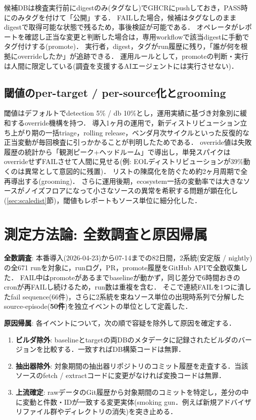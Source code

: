 \documentclass{css}
\begin{document}
候補DBは検査実行前にdigestのみ(タグなし)でGHCRにpushしておき，PASS時にのみタグを付けて「公開」する．
FAILした場合，候補はタグなしのままdigestで取得可能な状態で残るため，事後検証が可能である．
オペレータがレポートを確認し正当な変更と判断した場合は，専用workflowで該当digestに手動でタグ付けする(promote)．
実行者，digest，タグがrun履歴に残り，「誰が何を根拠にoverrideしたか」が追跡できる．
運用ルールとして，promoteの判断・実行は人間に限定している(調査を支援するAIエージェントには実行させない)．

\subsection{閾値のper-target / per-source化とgrooming}
\label{sec:threshold}

閾値はデフォルトでdetection 5\% / db 10\%とし，運用実績に基づき対象別に緩和するoverride機構を持つ．
導入1ヶ月の運用で，新ディストリビューション立ち上がり期の一括triage，rolling release，ベンダ月次サイクルといった反復的な正当変動が毎回検査に引っかかることが判明したためである．
override値は失敗履歴の統計から「観測ピーク+ヘッドルーム」で導出し，単発スパイクはoverrideせずFAILさせて人間に見せる(例: EOLディストリビューションが39\%動くのは異常として意図的に残置)．
リストの陳腐化を防ぐため約2ヶ月周期で全再導出する(grooming)．
さらに運用後期，ecosystem一括の変動率では大きなソースがノイズフロアになって小さなソースの異常を希釈する問題が顕在化し(\ref{sec:scaledist}節)，閾値もレポートもソース単位に細分化した．

\section{測定方法論: 全数調査と原因帰属}
\label{sec:method}

\textbf{全数調査}:
本番導入(2026-04-23)から07-14までの82日間，2系統(安定版 / nightly)の全671 runを対象に，runログ，PR，promote履歴をGitHub APIで全数収集した．
FAIL中はpromoteがあるまでbaselineが動かず，同じ差分で6時間おきのcronが再FAILし続けるため，run数は重複を含む．
そこで連続FAILを1つに潰したfail sequence(66件)，さらに2系統を束ねソース単位の出現時系列で分解したsource-episode(\textbf{50件})を独立イベントの単位として定義した．

\textbf{原因帰属}:
各イベントについて，次の順で容疑を除外して原因を確定する．

\begin{enumerate}
\item \textbf{ビルダ除外}: baselineとtargetの両DBのメタデータに記録されたビルダのバージョンを比較する．一致すればDB構築コードは無罪．
\item \textbf{抽出器除外}: 対象期間の抽出器リポジトリのコミット履歴を走査する．当該ソースのfetch / extractコードに変更がなければ変換コードは無罪．
\item \textbf{上流確定}: rawデータのGit履歴から対象期間のコミットを特定し，差分の中に変動と件数・IDが一致する変更実体(smoking gun．例えば新規アドバイザリファイル群やディレクトリの消失)を突き止める．
\end{enumerate}
\end{document}
